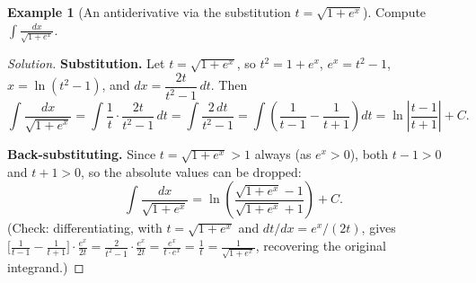 \documentclass[11pt]{article}
\theoremstyle{definition}
\newtheorem{example}{Example}[section]
\begin{document}
\begin{example}[An antiderivative via the substitution $t=\sqrt{1+e^x}$]
Compute $\displaystyle\int\frac{dx}{\sqrt{1+e^x}}$.
\end{example}
\begin{proof}[Solution]
\textbf{Substitution.} Let $t=\sqrt{1+e^x}$, so $t^2=1+e^x$, $e^x=t^2-1$, $x=\ln(t^2-1)$, and $dx=\dfrac{2t}{t^2-1}\,dt$. Then
\[
\int\frac{dx}{\sqrt{1+e^x}}=\int\frac1t\cdot\frac{2t}{t^2-1}\,dt=\int\frac{2\,dt}{t^2-1}=\int\left(\frac1{t-1}-\frac1{t+1}\right)dt=\ln\left|\frac{t-1}{t+1}\right|+C.
\]

\textbf{Back-substituting.} Since $t=\sqrt{1+e^x}>1$ always (as $e^x>0$), both $t-1>0$ and $t+1>0$, so the absolute values can be dropped:
\[
\boxed{\int\frac{dx}{\sqrt{1+e^x}}=\ln\left(\frac{\sqrt{1+e^x}-1}{\sqrt{1+e^x}+1}\right)+C}.
\]
(Check: differentiating, with $t=\sqrt{1+e^x}$ and $dt/dx=e^x/(2t)$, gives $\bigl[\tfrac1{t-1}-\tfrac1{t+1}\bigr]\cdot\tfrac{e^x}{2t}=\tfrac2{t^2-1}\cdot\tfrac{e^x}{2t}=\tfrac{e^x}{t\cdot e^x}=\tfrac1t=\tfrac1{\sqrt{1+e^x}}$, recovering the original integrand.)
\end{proof}
\end{document}
